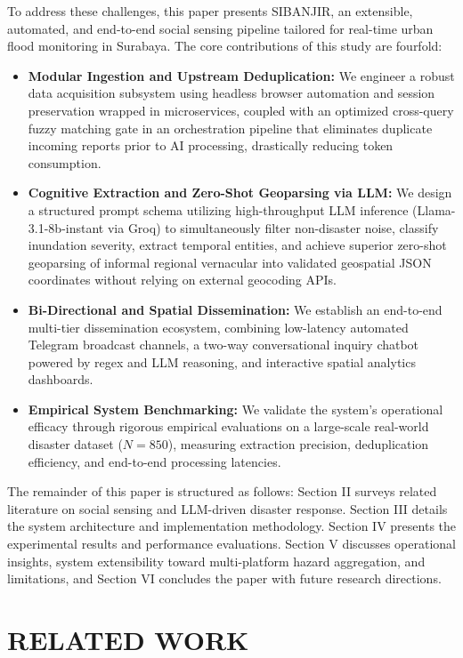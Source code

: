 \documentclass[conference]{IEEEtran}
\begin{document}
To address these challenges, this paper presents SIBANJIR, an extensible, automated, and end-to-end social sensing pipeline tailored for real-time urban flood monitoring in Surabaya. The core contributions of this study are fourfold:
\begin{itemize}
    \item \textbf{Modular Ingestion and Upstream Deduplication:} We engineer a robust data acquisition subsystem using headless browser automation and session preservation wrapped in microservices, coupled with an optimized cross-query fuzzy matching gate in an orchestration pipeline that eliminates duplicate incoming reports prior to AI processing, drastically reducing token consumption.
    \item \textbf{Cognitive Extraction and Zero-Shot Geoparsing via LLM:} We design a structured prompt schema utilizing high-throughput LLM inference (Llama-3.1-8b-instant via Groq) to simultaneously filter non-disaster noise, classify inundation severity, extract temporal entities, and achieve superior zero-shot geoparsing of informal regional vernacular into validated geospatial JSON coordinates without relying on external geocoding APIs.
    \item \textbf{Bi-Directional and Spatial Dissemination:} We establish an end-to-end multi-tier dissemination ecosystem, combining low-latency automated Telegram broadcast channels, a two-way conversational inquiry chatbot powered by regex and LLM reasoning, and interactive spatial analytics dashboards.
    \item \textbf{Empirical System Benchmarking:} We validate the system’s operational efficacy through rigorous empirical evaluations on a large-scale real-world disaster dataset ($N=850$), measuring extraction precision, deduplication efficiency, and end-to-end processing latencies.
\end{itemize}

The remainder of this paper is structured as follows: Section II surveys related literature on social sensing and LLM-driven disaster response. Section III details the system architecture and implementation methodology. Section IV presents the experimental results and performance evaluations. Section V discusses operational insights, system extensibility toward multi-platform hazard aggregation, and limitations, and Section VI concludes the paper with future research directions.


\section{RELATED WORK}
\end{document}
